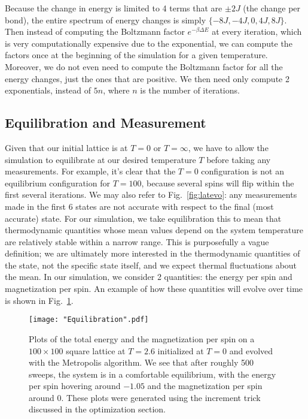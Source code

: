 \documentclass[twocolumn,aps,prl]{revtex4-1} %
\begin{document}
Because the change in energy is limited to 4 terms that are $\pm 2J$ (the change per bond), the entire spectrum of energy changes is simply $\{-8J, -4J, 0, 4J, 8J\}$. Then instead of computing the Boltzmann factor $e^{-\beta\Delta E}$ at every iteration, which is very computationally expensive due to the exponential, we can compute the factors once at the beginning of the simulation for a given temperature. Moreover, we do not even need to compute the Boltzmann factor for all the energy changes, just the ones that are positive. We then need only compute 2 exponentials, instead of $5n$, where $n$ is the number of iterations.

\subsection{Equilibration and Measurement}
Given that our initial lattice is at $T = 0$ or $T = \infty$, we have to allow the simulation to equilibrate at our desired temperature $T$ before taking any measurements. For example, it's clear that the $T = 0$ configuration is not an equilibrium configuration for $T = 100$, because several spins will flip within the first several iterations. We may also refer to Fig.~\ref{fig:latevo}: any measurements made in the first 6 states are not accurate with respect to the final (most accurate) state. For our simulation, we take equilibration this to mean that thermodynamic quantities whose mean values depend on the system temperature are relatively stable within a narrow range. This is purposefully a vague definition; we are ultimately more interested in the thermodynamic quantities of the state, not the specific state itself, and we expect thermal fluctuations about the mean. In our simulation, we consider 2 quantities: the energy per spin and magnetization per spin. An example of how these quantities will evolve over time is shown in Fig.~\ref{fig:equil}. 
\begin{figure}
	\texttt{[image: "Equilibration".pdf]}
	\caption{\label{fig:equil}Plots of the total energy and the magnetization per spin on a $100 \times 100$ square lattice at $T = 2.6$ initialized at $T = 0$ and evolved with the Metropolis algorithm. We see that after roughly 500 sweeps, the system is in a comfortable equilibrium, with the energy per spin hovering around $-1.05$ and the magnetization per spin around $0$. These plots were generated using the increment trick discussed in the optimization section.}
\end{figure}
\end{document}
